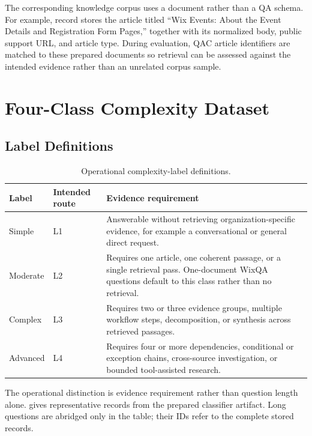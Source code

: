 The corresponding knowledge corpus uses a document rather than a QA schema.
For example, record
stores the article titled ``Wix Events: About the Event Details and Registration
Form Pages,'' together with its normalized body, public support URL, and article
type. During evaluation, QAC article identifiers are matched to these prepared
documents so retrieval can be assessed against the intended evidence rather
than an unrelated corpus sample.

\section{Four-Class Complexity Dataset}

\subsection{Label Definitions}

\begin{table}[H]
  \centering
  \caption{Operational complexity-label definitions.}
  \label{tab:complexity-labels}
  \begin{tabularx}{\textwidth}{p{}p{}X}
    \toprule
    Label & Intended route & Evidence requirement\\
    \midrule
    Simple & L1 & Answerable without retrieving organization-specific
    evidence, for example a conversational or general direct request.\\
    Moderate & L2 & Requires one article, one coherent passage, or a single
    retrieval pass. One-document WixQA questions default to this class rather
    than no retrieval.\\
    Complex & L3 & Requires two or three evidence groups, multiple workflow
    steps, decomposition, or synthesis across retrieved passages.\\
    Advanced & L4 & Requires four or more dependencies, conditional or
    exception chains, cross-source investigation, or bounded tool-assisted
    research.\\
    \bottomrule
  \end{tabularx}
\end{table}

The operational distinction is evidence requirement rather than question
length alone.  gives representative records from
the prepared classifier artifact. Long questions are abridged only in the
table; their IDs refer to the complete stored records.

